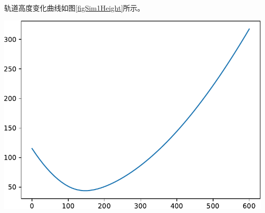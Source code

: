 轨道高度变化曲线如图\ref{figSim1Height}所示。
\begin{center}
	\includegraphics[scale=0.6]{sim1Height.pdf} \\
	\label{figSim1Height}
\end{center}


